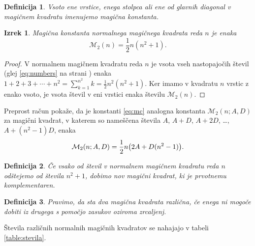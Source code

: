 \documentclass[a4paper,12pt]{article}
\newtheorem{definicija}{Definicija}
\newtheorem{izrek}{Izrek}
\newcommand{\m}{\mathcal{M}}
\begin{document}
\begin{definicija}
   Vsoto ene vrstice, enega stolpca ali ene od glavnih diagonal
   v magičnem kvadratu imenujemo \emph{magična konstanta}.
\end{definicija}


\begin{izrek}
   Magična konstanta normalnega magičnega kvadrata reda \(n\)
   je enaka
   \begin{equation}
      \label{eq:mc}
      \m_2(n) = \frac{1}{2} n (n^2 + 1).
   \end{equation}
\end{izrek}


\begin{proof}
   V normalnem magičnem kvadratu reda \(n\) je vsota vseh nastopajočih
   števil (glej \eqref{eq:numbers} na strani \pageref{eq:numbers}) enaka
   \(1 + 2 + 3 + \cdots + n ^ 2 = \sum_{k = 1}^{n ^ 2} k = \frac{1}{2} n ^ 2 (n ^ 2 + 1)\).
   Ker imamo
   v kvadratu \(n\) vrstic z enako vsoto, je vsota števil v eni vrstici
   enaka številu \(\m_2(n)\). %
\end{proof}

Preprost račun pokaže, da je konstanti \eqref{eq:mc} analogna konstanta
\(\m_2(n;A,D)\) za magični kvadrat, v katerem so nameščena števila
\(A\), \(A+D\), \(A+2D\), \ldots, \(A+(n^2-1)D\), enaka %
\[
\m_2 (n; A, D) = \frac{1}{2} n \big{(}2A + D(n ^ 2 - 1)\big{)}.
\]

 \begin{definicija}
      Če vsako od števil v normalnem magičnem kvadratu reda \(n\) odštejemo
      od števila \(n ^ 2 + 1\), dobimo nov magični kvadrat, ki je prvotnemu
      \emph{komplementaren}.
 \end{definicija}

 \begin{definicija}
      Pravimo, da sta dva magična kvadrata \emph{različna}, če enega ni mogoče dobiti
      iz drugega s pomočjo zasukov oziroma zrcaljenj.
 \end{definicija}

Števila različnih normalnih magičnih kvadratov se nahajajo v tabeli \ref{table:stevila}.


      
      
\end{document}
